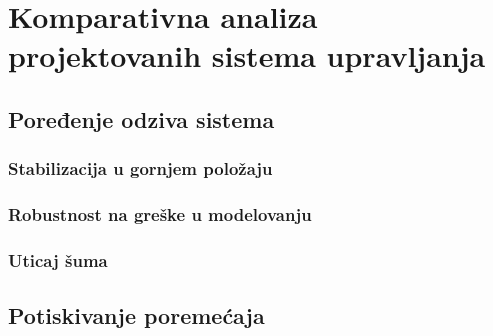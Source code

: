 \documentclass[a4paper,11pt]{article}
\theoremstyle{definition} \newtheorem{deff}{Definicija}[section]
\theoremstyle{definition} \newtheorem{prim}[deff]{Primer}
\theoremstyle{plain} \newtheorem{teor}[deff]{Teorema}
\begin{document}
	
	
	
	\newpage
	
	
	\section{Komparativna analiza projektovanih sistema upravljanja}
	
	\subsection{Poređenje odziva sistema}
	\subsubsection{Stabilizacija u gornjem položaju}
	
	\subsubsection{Robustnost na greške u modelovanju}
	\subsubsection{Uticaj šuma}
	
	\subsection{Potiskivanje poremećaja}
	
	
	
\end{document}

